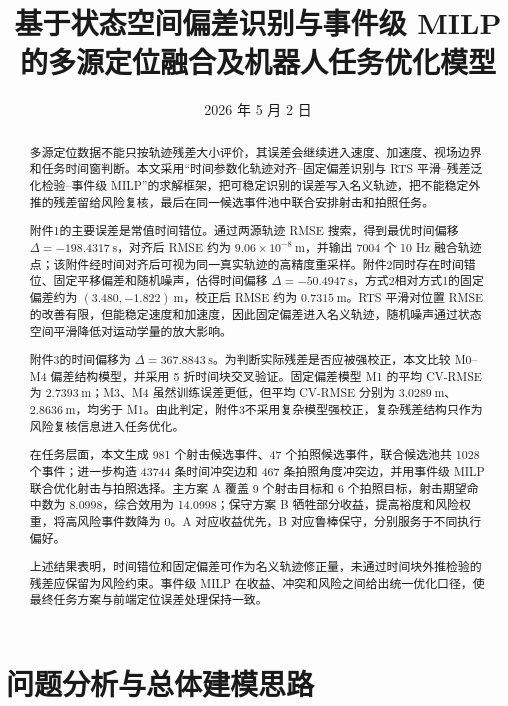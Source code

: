 \documentclass{cumcmthesis}
\title{基于状态空间偏差识别与事件级 MILP 的多源定位融合及机器人任务优化模型}
\date{2026 年 5 月 2 日}
\begin{document}
\maketitle

\begin{abstract}
多源定位数据不能只按轨迹残差大小评价，其误差会继续进入速度、加速度、视场边界和任务时间窗判断。本文采用“时间参数化轨迹对齐--固定偏差识别与 RTS 平滑--残差泛化检验--事件级 MILP”的求解框架，把可稳定识别的误差写入名义轨迹，把不能稳定外推的残差留给风险复核，最后在同一候选事件池中联合安排射击和拍照任务。

附件1的主要误差是常值时间错位。通过两源轨迹 RMSE 搜索，得到最优时间偏移 $\Delta=-198.4317\ \mathrm{s}$，对齐后 RMSE 约为 $9.06\times10^{-8}\ \mathrm{m}$，并输出 7004 个 10 Hz 融合轨迹点；该附件经时间对齐后可视为同一真实轨迹的高精度重采样。附件2同时存在时间错位、固定平移偏差和随机噪声，估得时间偏移 $\Delta=-50.4947\ \mathrm{s}$，方式2相对方式1的固定偏差约为 $(3.480,-1.822)\ \mathrm{m}$，校正后 RMSE 约为 $0.7315\ \mathrm{m}$。RTS 平滑对位置 RMSE 的改善有限，但能稳定速度和加速度，因此固定偏差进入名义轨迹，随机噪声通过状态空间平滑降低对运动学量的放大影响。

附件3的时间偏移为 $\Delta=367.8843\ \mathrm{s}$。为判断实际残差是否应被强校正，本文比较 M0--M4 偏差结构模型，并采用 5 折时间块交叉验证。固定偏差模型 M1 的平均 CV-RMSE 为 $2.7393\ \mathrm{m}$；M3、M4 虽然训练误差更低，但平均 CV-RMSE 分别为 $3.0289\ \mathrm{m}$、$2.8636\ \mathrm{m}$，均劣于 M1。由此判定，附件3不采用复杂模型强校正，复杂残差结构只作为风险复核信息进入任务优化。

在任务层面，本文生成 981 个射击候选事件、47 个拍照候选事件，联合候选池共 1028 个事件；进一步构造 43744 条时间冲突边和 467 条拍照角度冲突边，并用事件级 MILP 联合优化射击与拍照选择。主方案 A 覆盖 9 个射击目标和 6 个拍照目标，射击期望命中数为 8.0998，综合效用为 14.0998；保守方案 B 牺牲部分收益，提高裕度和风险权重，将高风险事件数降为 0。A 对应收益优先，B 对应鲁棒保守，分别服务于不同执行偏好。

上述结果表明，时间错位和固定偏差可作为名义轨迹修正量，未通过时间块外推检验的残差应保留为风险约束。事件级 MILP 在收益、冲突和风险之间给出统一优化口径，使最终任务方案与前端定位误差处理保持一致。

\end{abstract}
\newpage

\section{问题分析与总体建模思路}
\end{document}
